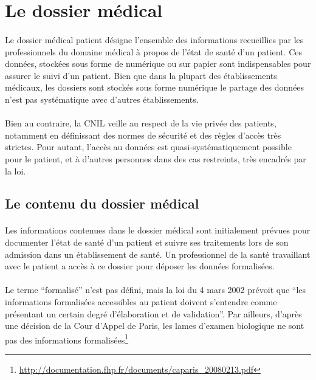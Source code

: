    \section{Le dossier médical}


\paragraph{}
Le dossier médical patient désigne l'ensemble des informations recueillies par
les professionnels du domaine médical à propos de l'état de santé d'un patient.
Ces données, stockées sous forme de numérique ou sur papier sont indispensables
pour assurer le suivi d'un patient. Bien que dans la plupart des établissements
médicaux, les dossiers sont stockés sous forme numérique le partage des données
n'est pas systématique avec d'autres établissements.

\paragraph{}
Bien au contraire, la CNIL veille au respect de la vie privée des patients,
notamment en définissant des normes de sécurité et des règles d'accès très
strictes. Pour autant, l'accès au données est quasi-systématiquement possible
pour le patient, et à d'autres personnes dans des cas restreints, très encadrés
par la loi.


        \subsection{Le contenu du dossier médical}

\paragraph{}
Les informations contenues dans le dossier médical sont initialement prévues
pour documenter l'état de santé d'un patient et suivre ses traitements lors de
son admission dans un établissement de santé.  Un professionnel de la santé
travaillant avec le patient a accès à ce dossier pour déposer les données
formalisées.

\paragraph{}
Le terme ``formalisé'' n'est pas défini, mais la loi du 4 mars 2002 prévoit que
``les informations formalisées accessibles au patient doivent s'entendre comme
présentant un certain degré d'élaboration et de validation''. Par ailleurs,
d'après une décision de la Cour d'Appel de Paris, les lames d'examen biologique
ne sont pas des informations
formalisées\footnote{\url{http://documentation.fhp.fr/documents/caparis_20080213.pdf}}

